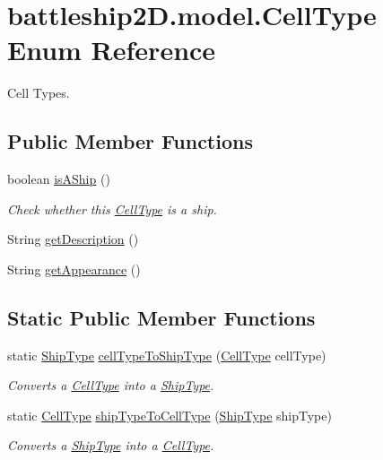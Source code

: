 \hypertarget{enumbattleship2D_1_1model_1_1CellType}{\section{battleship2\-D.\-model.\-Cell\-Type Enum Reference}
\label{enumbattleship2D_1_1model_1_1CellType}
}


Cell Types.  


\subsection*{Public Member Functions}
\begin{DoxyCompactItemize}
\item 
boolean \hyperlink{enumbattleship2D_1_1model_1_1CellType_a704b9068d644f547792823905a772f2a}{is\-A\-Ship} ()
\begin{DoxyCompactList}\small\item\em Check whether this \hyperlink{enumbattleship2D_1_1model_1_1CellType}{Cell\-Type} is a ship. \end{DoxyCompactList}\item 
String \hyperlink{enumbattleship2D_1_1model_1_1CellType_aed7191d88c4d7712a6ca555c1a715243}{get\-Description} ()
\item 
String \hyperlink{enumbattleship2D_1_1model_1_1CellType_a2af2beb0ae9a067bba1c6ddea4f9d0ae}{get\-Appearance} ()
\end{DoxyCompactItemize}
\subsection*{Static Public Member Functions}
\begin{DoxyCompactItemize}
\item 
static \hyperlink{enumbattleship2D_1_1model_1_1ShipType}{Ship\-Type} \hyperlink{enumbattleship2D_1_1model_1_1CellType_a41eeb4c56d05d406a34cc4ad9996c329}{cell\-Type\-To\-Ship\-Type} (\hyperlink{enumbattleship2D_1_1model_1_1CellType}{Cell\-Type} cell\-Type)
\begin{DoxyCompactList}\small\item\em Converts a \hyperlink{enumbattleship2D_1_1model_1_1CellType}{Cell\-Type} into a \hyperlink{enumbattleship2D_1_1model_1_1ShipType}{Ship\-Type}. \end{DoxyCompactList}\item 
static \hyperlink{enumbattleship2D_1_1model_1_1CellType}{Cell\-Type} \hyperlink{enumbattleship2D_1_1model_1_1CellType_a5d3b8fd30d9afa7a8505074b87850719}{ship\-Type\-To\-Cell\-Type} (\hyperlink{enumbattleship2D_1_1model_1_1ShipType}{Ship\-Type} ship\-Type)
\begin{DoxyCompactList}\small\item\em Converts a \hyperlink{enumbattleship2D_1_1model_1_1ShipType}{Ship\-Type} into a \hyperlink{enumbattleship2D_1_1model_1_1CellType}{Cell\-Type}. \end{DoxyCompactList}\end{DoxyCompactItemize}
